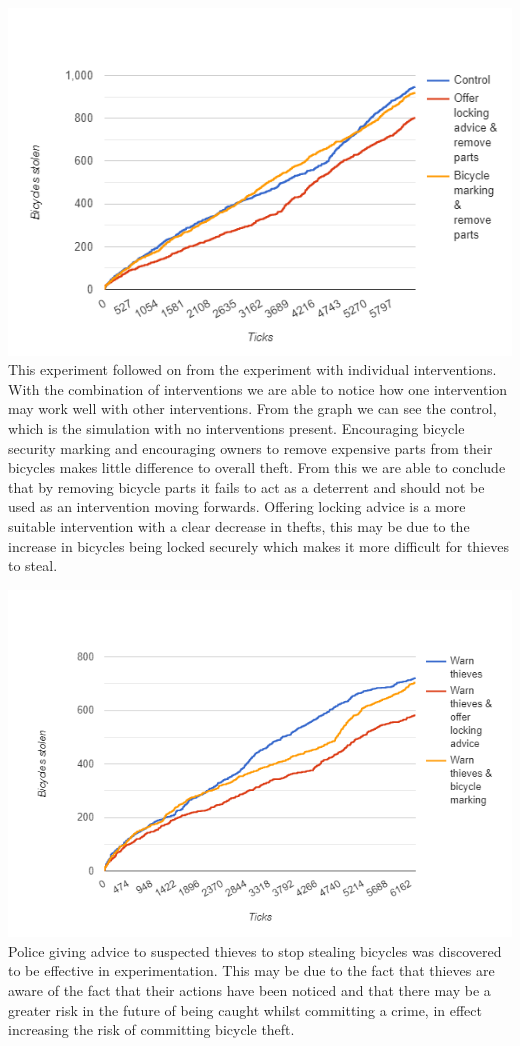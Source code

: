 \documentclass[11pt]{informatics-report}
\begin{document}
\includegraphics[width = 1\textwidth]{lockingadvice.png}
This experiment followed on from the experiment with individual interventions. With the combination of interventions we are able to notice how one intervention may work well with other interventions. From the graph we can see the control, which is the simulation with no interventions present. Encouraging bicycle security marking and encouraging owners to remove expensive parts from their bicycles makes little difference to overall theft. From this we are able to conclude that by removing bicycle parts it fails to act as a deterrent and should not be used as an intervention moving forwards. Offering locking advice is a more suitable intervention with a clear decrease in thefts, this may be due to the increase in bicycles being locked securely which makes it more difficult for thieves to steal.

\includegraphics[width = 1\textwidth]{warnall.png}
Police giving advice to suspected thieves to stop stealing bicycles was discovered to be effective in experimentation. This may be due to the fact that thieves are aware of the fact that their actions have been noticed and that there may be a greater risk in the future of being caught whilst committing a crime, in effect increasing the risk of committing bicycle theft. \par
\end{document}
